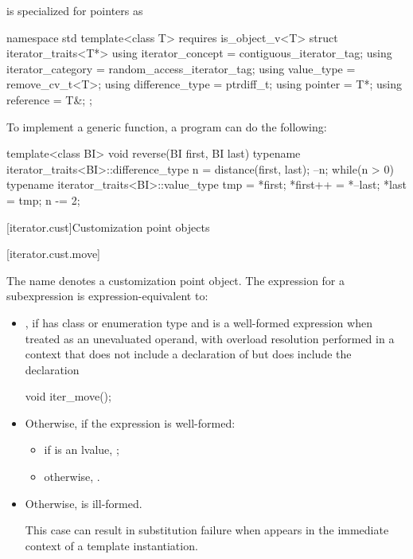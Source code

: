 \pnum
{} is specialized for pointers as
\begin{codeblock}
namespace std {
  template<class T>
    requires is_object_v<T>
  struct iterator_traits<T*> {
    using iterator_concept  = contiguous_iterator_tag;
    using iterator_category = random_access_iterator_tag;
    using value_type        = remove_cv_t<T>;
    using difference_type   = ptrdiff_t;
    using pointer           = T*;
    using reference         = T&;
  };
}
\end{codeblock}

\pnum
\begin{example}
To implement a generic
function, a \Cpp{} program can do the following:
\begin{codeblock}
template<class BI>
void reverse(BI first, BI last) {
  typename iterator_traits<BI>::difference_type n =
    distance(first, last);
  --n;
  while(n > 0) {
    typename iterator_traits<BI>::value_type
     tmp = *first;
    *first++ = *--last;
    *last = tmp;
    n -= 2;
  }
}
\end{codeblock}
\end{example}

[iterator.cust]{Customization point objects}

[iterator.cust.move]{}

%
\pnum
The name  denotes
a customization point object.
The expression  for a subexpression  is
expression-equivalent to:

\begin{itemize}
\item {}, if
 has class or enumeration type and
 is a well-formed expression when treated as an unevaluated operand,
with overload resolution performed in a context
that does not include a declaration of 
but does include the declaration
\begin{codeblock}
void iter_move();
\end{codeblock}

\item Otherwise, if the expression  is well-formed:
\begin{itemize}
\item if  is an lvalue, ;

\item otherwise, .
\end{itemize}

\item Otherwise,  is ill-formed.
\begin{note}
This case can result in substitution failure when 
appears in the immediate context of a template instantiation.
\end{note}
\end{itemize}

